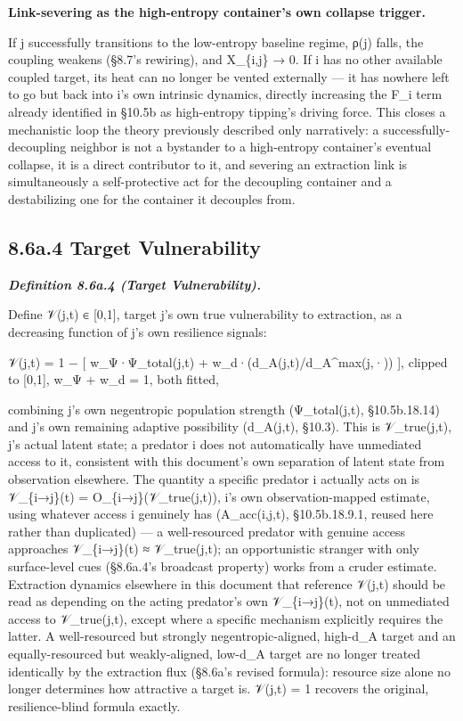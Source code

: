 \documentclass[
]{article}
\begin{document}
\textbf{Link-severing as the high-entropy container's own collapse
trigger.}

If j successfully transitions to the low-entropy baseline regime, ρ(j)
falls, the coupling weakens (§8.7's rewiring), and X\_\{i,j\} → 0. If i
has no other available coupled target, its heat can no longer be vented
externally --- it has nowhere left to go but back into i's own intrinsic
dynamics, directly increasing the F\_i term already identified in §10.5b
as high-entropy tipping's driving force. This closes a mechanistic loop
the theory previously described only narratively: a
successfully-decoupling neighbor is not a bystander to a high-entropy
container's eventual collapse, it is a direct contributor to it, and
severing an extraction link is simultaneously a self-protective act for
the decoupling container and a destabilizing one for the container it
decouples from.

\hypertarget{a.4-target-vulnerability}{%
\subsection{8.6a.4 Target
Vulnerability}\label{a.4-target-vulnerability}}

\emph{\textbf{Definition 8.6a.4 (Target Vulnerability).}}

Define 𝒱(j,t) ∈ {[}0,1{]}, target j's own true vulnerability to
extraction, as a decreasing function of j's own resilience signals:

𝒱(j,t) = 1 − {[} w\_Ψ·Ψ\_total(j,t) + w\_d·(d\_A(j,t)/d\_A\^{}max(j,·))
{]}, clipped to {[}0,1{]}, w\_Ψ + w\_d = 1, both fitted,

combining j's own negentropic population strength (Ψ\_total(j,t),
§10.5b.18.14) and j's own remaining adaptive possibility (d\_A(j,t),
§10.3). This is 𝒱\_true(j,t), j's actual latent state; a predator i does
not automatically have unmediated access to it, consistent with this
document's own separation of latent state from observation elsewhere.
The quantity a specific predator i actually acts on is 𝒱\_\{i→j\}(t) =
O\_\{i→j\}(𝒱\_true(j,t)), i's own observation-mapped estimate, using
whatever access i genuinely has (A\_acc(i,j,t), §10.5b.18.9.1, reused
here rather than duplicated) --- a well-resourced predator with genuine
access approaches 𝒱\_\{i→j\}(t) ≈ 𝒱\_true(j,t); an opportunistic
stranger with only surface-level cues (§8.6a.4's broadcast property)
works from a cruder estimate. Extraction dynamics elsewhere in this
document that reference 𝒱(j,t) should be read as depending on the acting
predator's own 𝒱\_\{i→j\}(t), not on unmediated access to 𝒱\_true(j,t),
except where a specific mechanism explicitly requires the latter. A
well-resourced but strongly negentropic-aligned, high-d\_A target and an
equally-resourced but weakly-aligned, low-d\_A target are no longer
treated identically by the extraction flux (§8.6a's revised formula):
resource size alone no longer determines how attractive a target is.
𝒱(j,t) = 1 recovers the original, resilience-blind formula exactly.
\end{document}
